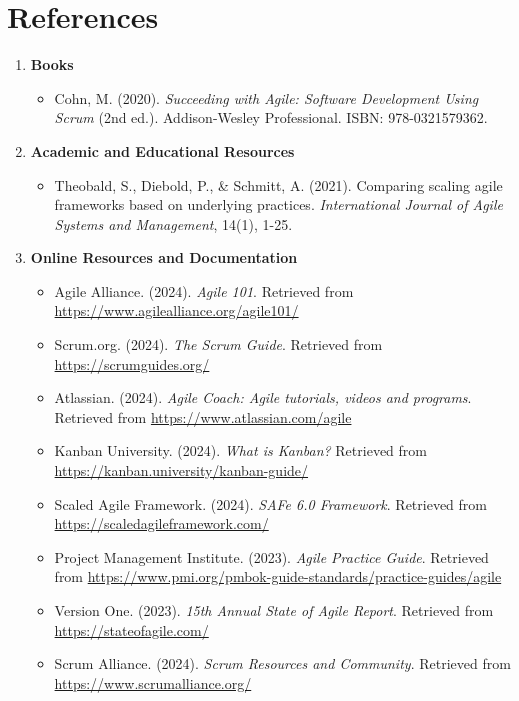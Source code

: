\chapter{References}

\begin{enumerate}[label={\Alph*.}]
  \item \textbf{Books}
        \begin{itemize}
          \item Cohn, M. (2020). \textit{Succeeding with Agile: Software Development Using Scrum} (2nd ed.). Addison-Wesley Professional. ISBN: 978-0321579362.
        \end{itemize}
  \item \textbf{Academic and Educational Resources}
        \begin{itemize}
          \item Theobald, S., Diebold, P., \& Schmitt, A. (2021). Comparing scaling agile frameworks based on underlying practices. \textit{International Journal of Agile Systems and Management}, 14(1), 1-25.
        \end{itemize}
  \item \textbf{Online Resources and Documentation}
        \begin{itemize}
          \item Agile Alliance. (2024). \textit{Agile 101}. Retrieved from \url{https://www.agilealliance.org/agile101/}
          \item Scrum.org. (2024). \textit{The Scrum Guide}. Retrieved from \url{https://scrumguides.org/}
          \item Atlassian. (2024). \textit{Agile Coach: Agile tutorials, videos and programs}. Retrieved from \url{https://www.atlassian.com/agile}
          \item Kanban University. (2024). \textit{What is Kanban?} Retrieved from \url{https://kanban.university/kanban-guide/}
          \item Scaled Agile Framework. (2024). \textit{SAFe 6.0 Framework}. Retrieved from \url{https://scaledagileframework.com/}
          \item Project Management Institute. (2023). \textit{Agile Practice Guide}. Retrieved from \url{https://www.pmi.org/pmbok-guide-standards/practice-guides/agile}
          \item Version One. (2023). \textit{15th Annual State of Agile Report}. Retrieved from \url{https://stateofagile.com/}
          \item Scrum Alliance. (2024). \textit{Scrum Resources and Community}. Retrieved from \url{https://www.scrumalliance.org/}

\end{itemize}
\end{enumerate}
